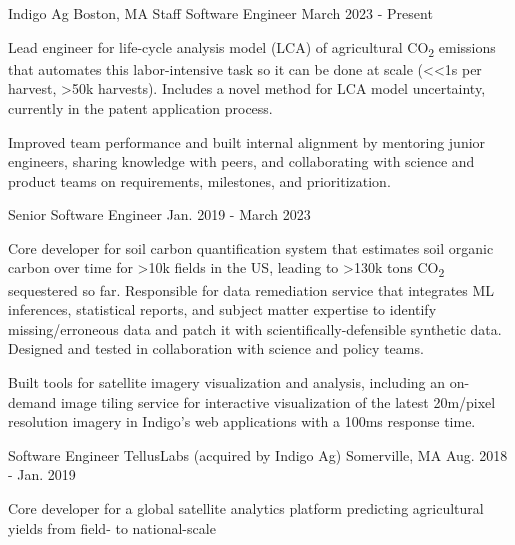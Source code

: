 \documentclass[11pt, a4paper]{awesome-cv}
\begin{document}
\begin{cventries}






  \cventrydouble
    {Indigo Ag}  %
    {Boston, MA}  %
    {Staff Software Engineer}  %
    {March 2023 - Present}  %
    {
    \begin{cvitems}
      \item Lead engineer for life-cycle analysis model (LCA) of agricultural CO\textsubscript{2} emissions that automates this labor-intensive task so it can be done at scale (<<1s per harvest, >50k harvests). Includes a novel method for LCA model uncertainty, currently in the patent application process. 
      \item Improved team performance and built internal alignment by mentoring junior engineers, sharing knowledge with peers, and collaborating with science and product teams on requirements, milestones, and prioritization.
    \end{cvitems}
    }
    {Senior Software Engineer}  %
    {Jan. 2019 - March 2023}  %
    {
    \begin{cvitems}
      \item Core developer for soil carbon quantification system that estimates soil organic carbon over time for >10k fields in the US, leading to >130k tons CO\textsubscript{2} sequestered so far. Responsible for data remediation service that integrates ML inferences, statistical reports, and subject matter expertise to identify missing/erroneous data and patch it with scientifically-defensible synthetic data. Designed and tested in collaboration with science and policy teams.
      \item Built tools for satellite imagery visualization and analysis, including an on-demand image tiling service for interactive visualization of the latest 20m/pixel resolution imagery in Indigo’s web applications with a 100ms response time.
    \end{cvitems}
    }

  \cventrytight
    {Software Engineer}
    {TellusLabs (acquired by Indigo Ag)}
    {Somerville, MA}
    {Aug. 2018 - Jan. 2019}
    {
    \begin{cvitems}
      \item Core developer for a global satellite analytics platform predicting agricultural yields from field- to national-scale
    \end{cvitems}
    }


\end{cventries}
\end{document}
